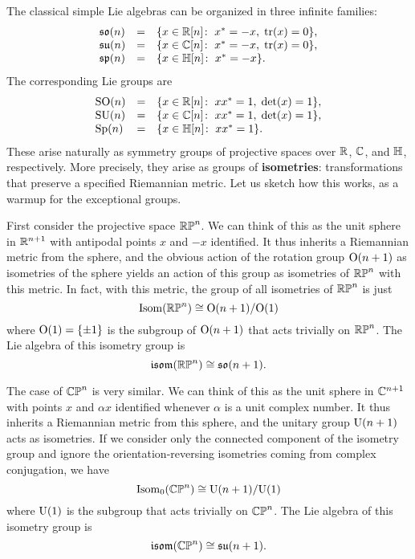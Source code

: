 The classical simple Lie algebras can be organized in three infinite
families:
\[
\begin{array}{lcl}
 {\mathfrak {so}}(n) &=&  \{ x \in {\mathbb R}[n] \colon \; x^* = -x, \; {\rm tr}(x) = 0\},   \\
 {\mathfrak {su}}(n) &=&  \{ x \in {\mathbb C}[n] \colon \; x^* = -x, \; {\rm tr}(x) = 0\},   \\
 {\mathfrak {sp}}(n) &=&  \{ x \in {\mathbb H}[n] \colon \; x^* = -x \}.   
\end{array}
\]
The corresponding Lie groups are
\[
\begin{array}{lcl}
 {\rm SO}(n) &=&  \{ x \in {\mathbb R}[n] \colon \; xx^* = 1, \; \det(x) = 1\},   \\
 {\rm SU}(n) &=&  \{ x \in {\mathbb C}[n] \colon \; xx^* = 1, \; \det(x) = 1\},   \\
 {\rm Sp}(n) &=&  \{ x \in {\mathbb H}[n] \colon \; xx^* = 1 \}.   
\end{array}
\]
These arise naturally as symmetry groups of projective spaces over
${\mathbb R}$, ${\mathbb C}$, and ${\mathbb H}$, respectively.   More precisely, they arise as
groups of {\bf isometries}: transformations that preserve a specified
Riemannian metric.  Let us sketch how this works, as a warmup for the 
exceptional groups.  

First consider the projective space ${\mathbb {RP}}^n$.  We can think of this as
the unit sphere in ${\mathbb R}^{n+1}$ with antipodal points $x$ and $-x$
identified.  It thus inherits a Riemannian metric from the sphere,
and the obvious action of the rotation group ${\rm O}(n+1)$ as isometries
of the sphere yields an action of this group as isometries of ${\mathbb {RP}}^n$
with this metric.  In fact, with this metric, the group of all isometries 
of ${\mathbb {RP}}^n$ is just 
\[       {\rm Isom}({\mathbb {RP}}^n) \cong {\rm O}(n+1)/{\rm O}(1)  \]
where ${\rm O}(1) = \{\pm 1\}$ is the subgroup of ${\rm O}(n+1)$ that acts trivially
on ${\mathbb {RP}}^n$.  The Lie algebra of this isometry group is 
\[       {\mathfrak {isom}}({\mathbb {RP}}^n) \cong {\mathfrak {so}}(n+1) .\]

The case of ${\mathbb {CP}}^n$ is very similar.  We can think of this as the unit
sphere in  ${\mathbb C}^{n+1}$ with points $x$ and $\alpha x$ identified whenever
$\alpha$ is a unit complex number.  It thus inherits a Riemannian metric
from this sphere, and the unitary group ${\rm U}(n+1)$ acts as isometries.  
If we consider only the connected component of the isometry group and 
ignore the orientation-reversing isometries coming from complex 
conjugation, we have
\[       {\rm Isom}_0({\mathbb {CP}}^n) \cong {\rm U}(n+1)/{\rm U}(1)  \]
where ${\rm U}(1)$ is the subgroup that acts trivially on ${\mathbb {CP}}^n$.  
The Lie algebra of this isometry group is
\[       {\mathfrak {isom}}({\mathbb {CP}}^n) \cong {\mathfrak {su}}(n+1)  .\]

